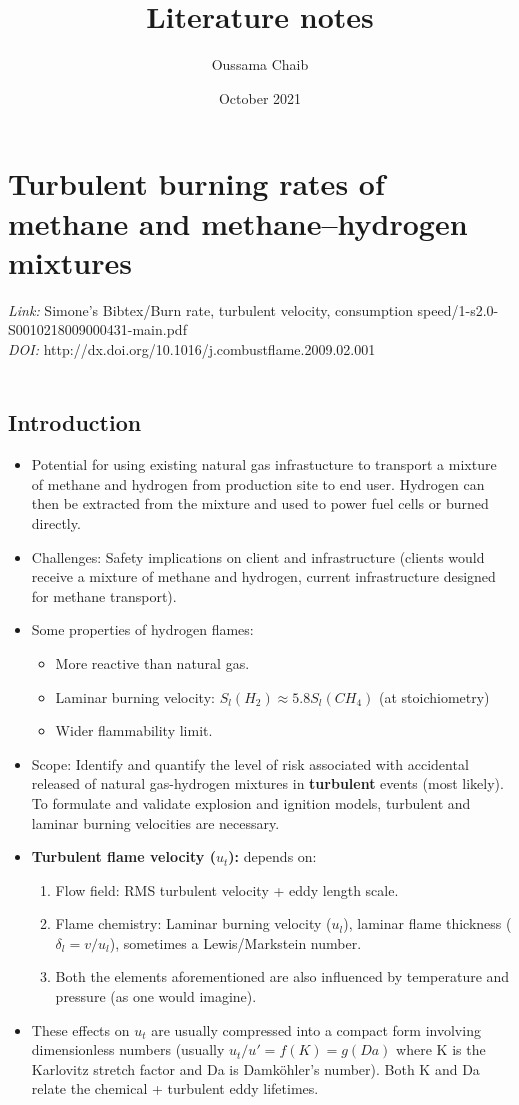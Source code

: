 \documentclass[a4paper,11pt]{article}
\title{
	Literature notes
}
\author{\small Oussama Chaib}
\date{\small October 2021}
\begin{document}
	\maketitle
\section{Turbulent burning rates of methane and methane–hydrogen mixtures }
\textit{Link:} Simone's Bibtex/Burn rate, turbulent velocity, consumption speed/1-s2.0-S0010218009000431-main.pdf\\
\textit{DOI:} http://dx.doi.org/10.1016/j.combustflame.2009.02.001\\ \\

\subsection{Introduction}
\begin{itemize}
	\item Potential for using existing natural gas infrastucture to transport a mixture of methane and hydrogen from production site to end user. Hydrogen can then be extracted from the mixture and used to power fuel cells or burned directly.
	\item Challenges: Safety implications on client and infrastructure (clients would receive a mixture of methane and hydrogen, current infrastructure designed for methane transport).
	\item Some properties of hydrogen flames:
	\begin{itemize}
		\item More reactive than natural gas.
		\item Laminar burning velocity: $S_l (H_2)  \approx 5.8 S_l (CH_4)$ (at stoichiometry)
		\item Wider flammability limit.
	\end{itemize}
	\item Scope: Identify and quantify the level of risk associated with accidental released of natural gas-hydrogen mixtures in \textbf{turbulent} events (most likely). To formulate and validate explosion and ignition models, turbulent and laminar burning velocities are necessary.
	\item \textbf{Turbulent flame velocity ($u_t$):} depends on:
	\begin{enumerate}
		\item Flow field: RMS turbulent velocity + eddy length scale.
		\item Flame chemistry: Laminar burning velocity ($u_l$), laminar flame thickness ($\delta_l = v/u_l$), sometimes a Lewis/Markstein number.
		\item Both the elements aforementioned are also influenced by temperature and pressure (as one would imagine).
	\end{enumerate}
	\item These effects on $u_t$ are usually compressed into a compact form involving dimensionless numbers (usually $u_t/u' = f(K) = g(Da)$ where K is the Karlovitz stretch factor and Da is Damköhler's number). Both K and Da relate the chemical + turbulent eddy lifetimes.
	
\end{itemize}
\end{document}
